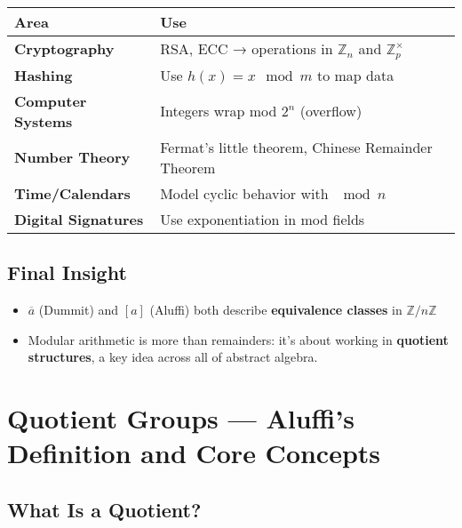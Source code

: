 \documentclass[]{article}
\providecommand{\tightlist}{%
  \setlength{\itemsep}{0pt}\setlength{\parskip}{0pt}}
\begin{document}
\begin{longtable}[]{@{}
  >{\raggedright\arraybackslash}p{}
  >{\raggedright\arraybackslash}p{}@{}}
\toprule\noalign{}
\begin{minipage}[b]{\linewidth}\raggedright
Area
\end{minipage} & \begin{minipage}[b]{\linewidth}\raggedright
Use
\end{minipage} \\
\midrule\noalign{}
\endhead
\bottomrule\noalign{}
\endlastfoot
\textbf{Cryptography} & RSA, ECC → operations in \(\mathbb{Z}_n\) and
\(\mathbb{Z}_p^\times\) \\
\textbf{Hashing} & Use \(h(x) = x \mod m\) to map data \\
\textbf{Computer Systems} & Integers wrap mod \(2^n\) (overflow) \\
\textbf{Number Theory} & Fermat's little theorem, Chinese Remainder
Theorem \\
\textbf{Time/Calendars} & Model cyclic behavior with \(\mod n\) \\
\textbf{Digital Signatures} & Use exponentiation in mod fields \\
\end{longtable}

\subsection{Final Insight}\label{final-insight}

\begin{itemize}
\tightlist
\item
  \(\overline{a}\) (Dummit) and \([a]\) (Aluffi) both describe
  \textbf{equivalence classes} in \(\mathbb{Z}/n\mathbb{Z}\)
\item
  Modular arithmetic is more than remainders: it's about working in
  \textbf{quotient structures}, a key idea across all of abstract
  algebra.
\end{itemize}

\section{Quotient Groups --- Aluffi's Definition and Core
Concepts}\label{quotient-groups-aluffis-definition-and-core-concepts}

\subsection{What Is a Quotient?}\label{what-is-a-quotient}
\end{document}
